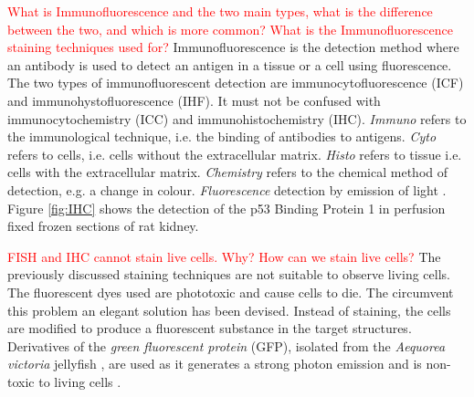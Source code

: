 \begin{definition}[Immunostaining]
	\textcolor{red}{What is Immunofluorescence and the two main types, what is the difference between the two, and which is more common? What is the Immunofluorescence staining techniques used for?}
	Immunofluorescence is the detection method where an antibody is used to detect an antigen in a tissue or a cell using fluorescence.
	The two types of immunofluorescent detection are immunocytofluorescence (ICF) and immunohystofluorescence (IHF).
	It must not be confused with immunocytochemistry (ICC) and immunohistochemistry (IHC).
	\textit{Immuno} refers to the immunological technique, i.e. the binding of antibodies to antigens.
	\textit{Cyto} refers to cells, i.e. cells without the extracellular matrix.
	\textit{Histo} refers to tissue i.e. cells with the extracellular matrix.
	\textit{Chemistry} refers to the chemical method of detection, e.g. a change in colour.
	\textit{Fluorescence} detection by emission of light \citep{Katikireddy2011}.
	Figure \ref{fig:IHC} shows the detection of the p53 Binding Protein 1 in perfusion fixed frozen sections of rat kidney.
\end{definition}

\begin{definition}
	\textcolor{red}{FISH and IHC cannot stain live cells. Why? How can we stain live cells?}
	The previously discussed staining techniques are not suitable to observe living cells.
	The fluorescent dyes used are phototoxic and cause cells to die. The circumvent this problem an elegant solution has been devised.
	Instead of staining, the cells are modified to produce a fluorescent substance in the target structures.
	Derivatives of the \textit{green fluorescent protein} (GFP), isolated from the \textit{Aequorea victoria} jellyfish \citep{Tsien1998,LichtmanConchello2005,Fatima2008}, are used as it generates a strong photon emission and is non-toxic to living cells \citep{Danek2012,Hubeny2008,Dobrucki2013}.
\end{definition}




